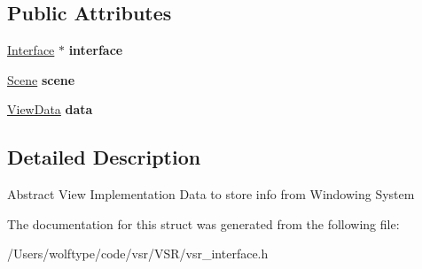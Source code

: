 \subsection*{Public Attributes}
\begin{DoxyCompactItemize}
\item 
\hypertarget{structvsr_1_1_interface_1_1_view_impl_a745fe85abea33554940b92a31fd6bae5}{\hyperlink{classvsr_1_1_interface}{Interface} $\ast$ {\bfseries interface}}\label{structvsr_1_1_interface_1_1_view_impl_a745fe85abea33554940b92a31fd6bae5}

\item 
\hypertarget{structvsr_1_1_interface_1_1_view_impl_aad2da9bcb1c74b9104842cd8e1ab7bfc}{\hyperlink{classvsr_1_1_scene}{Scene} {\bfseries scene}}\label{structvsr_1_1_interface_1_1_view_impl_aad2da9bcb1c74b9104842cd8e1ab7bfc}

\item 
\hypertarget{structvsr_1_1_interface_1_1_view_impl_a08def419e99a97576bc22fc0c1c7253e}{\hyperlink{structvsr_1_1_view_data}{View\-Data} {\bfseries data}}\label{structvsr_1_1_interface_1_1_view_impl_a08def419e99a97576bc22fc0c1c7253e}

\end{DoxyCompactItemize}


\subsection{Detailed Description}
Abstract View Implementation Data to store info from Windowing System 

The documentation for this struct was generated from the following file\-:\begin{DoxyCompactItemize}
\item 
/\-Users/wolftype/code/vsr/\-V\-S\-R/vsr\-\_\-interface.\-h\end{DoxyCompactItemize}
